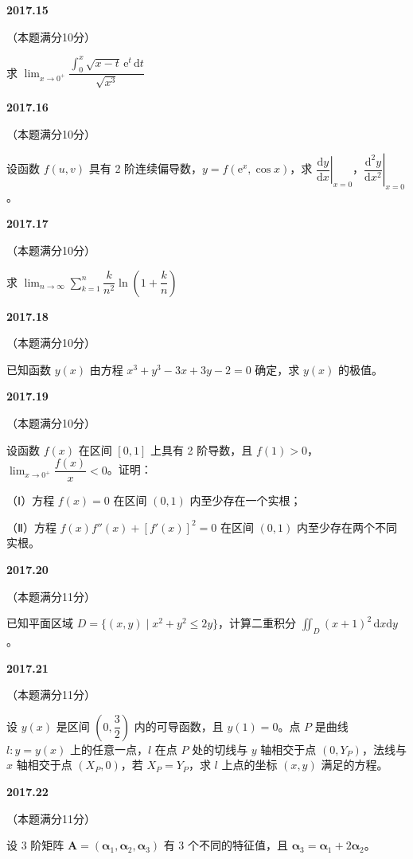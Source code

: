 \documentclass[UTF8,12pt,fontset=windows]{ctexart}
\begin{document}
\vfill
\newpage
{\large\bfseries 2017.15}

（本题满分10分）

求 $\lim_{x\to 0^+} \dfrac{\int_{0}^{x} \sqrt{x-t}\,\mathrm{e}^t\,\mathrm{d}t}{\sqrt{x^3}}$

\vfill
\newpage
{\large\bfseries 2017.16}

（本题满分10分）

设函数 $f(u,v)$ 具有 2 阶连续偏导数，$y = f(\mathrm{e}^x, \cos x)$，求 $\left.\dfrac{\mathrm{d}y}{\mathrm{d}x}\right|_{x=0}$，$\left.\dfrac{\mathrm{d}^2 y}{\mathrm{d}x^2}\right|_{x=0}$。

\vfill
\newpage
{\large\bfseries 2017.17}

（本题满分10分）

求 $\lim_{n\to\infty} \sum_{k=1}^{n} \dfrac{k}{n^2} \ln\left(1 + \dfrac{k}{n}\right)$

\vfill
\newpage
{\large\bfseries 2017.18}

（本题满分10分）

已知函数 $y(x)$ 由方程 $x^3 + y^3 - 3x + 3y - 2 = 0$ 确定，求 $y(x)$ 的极值。

\vfill
\newpage
{\large\bfseries 2017.19}

（本题满分10分）

设函数 $f(x)$ 在区间 $[0,1]$ 上具有 2 阶导数，且 $f(1) > 0$，$\lim_{x\to 0^+} \dfrac{f(x)}{x} < 0$。证明：

（Ⅰ）方程 $f(x) = 0$ 在区间 $(0,1)$ 内至少存在一个实根；

（Ⅱ）方程 $f(x)f''(x) + [f'(x)]^2 = 0$ 在区间 $(0,1)$ 内至少存在两个不同实根。

\vfill
\newpage
{\large\bfseries 2017.20}

（本题满分11分）

已知平面区域 $D = \{(x,y) \mid x^2 + y^2 \leqslant 2y\}$，计算二重积分 $\iint_D (x+1)^2\,\mathrm{d}x\mathrm{d}y$。

\vfill
\newpage
{\large\bfseries 2017.21}

（本题满分11分）

设 $y(x)$ 是区间 $\left(0, \dfrac{3}{2}\right)$ 内的可导函数，且 $y(1) = 0$。点 $P$ 是曲线 $l: y = y(x)$ 上的任意一点，$l$ 在点 $P$ 处的切线与 $y$ 轴相交于点 $(0, Y_P)$，法线与 $x$ 轴相交于点 $(X_P, 0)$，若 $X_P = Y_P$，求 $l$ 上点的坐标 $(x,y)$ 满足的方程。

\vfill
\newpage
{\large\bfseries 2017.22}

（本题满分11分）

设 3 阶矩阵 $\boldsymbol{A} = (\boldsymbol{\alpha}_1, \boldsymbol{\alpha}_2, \boldsymbol{\alpha}_3)$ 有 3 个不同的特征值，且 $\boldsymbol{\alpha}_3 = \boldsymbol{\alpha}_1 + 2\boldsymbol{\alpha}_2$。
\end{document}
